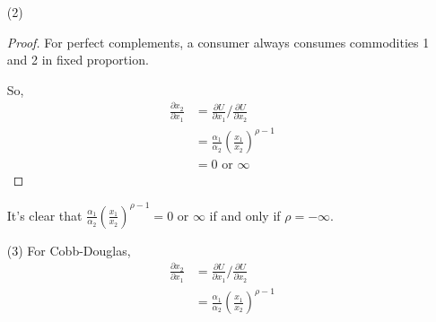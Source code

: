 \documentclass{article}
\begin{document}
\begin{enumerate}
\begin{enumerate}
\begin{proof}
            So, 
            \begin{equation}
                \begin{aligned}
                    \frac{\partial x_2}{\partial x_1}
                    &=\frac{\partial U}{\partial x_1}/\frac{\partial U}{\partial x_2} \\
                    &=\frac{\frac{1}{\rho}(\alpha_1x_1^{\rho}+\alpha_2x_2^{\rho})^{\frac{1}{\rho}-1}\alpha_1\rho x_1^{\rho-1}}{\frac{1}{\rho}(\alpha_1x_1^{\rho}+\alpha_2x_2^{\rho})^{\frac{1}{\rho}-1}\alpha_2\rho x_2^{\rho-1}} \\
                    &=\frac{\alpha_1}{\alpha_2}(\frac{x_1}{x_2})^{\rho-1} \\
                    &=\text{constant rate}
                \end{aligned} \nonumber
            \end{equation}
        \end{proof}
        It's clear that $\frac{\alpha_1}{\alpha_2}(\frac{x_1}{x_2})^{\rho-1}$ is constant if and only if $\rho=1$.
        \item[(2)] \begin{proof}
            For perfect complements, a consumer always consumes commodities 1 and 2 in fixed proportion.\par
            So, 
            \begin{equation}
                \begin{aligned}
                    \frac{\partial x_2}{\partial x_1}
                    &=\frac{\partial U}{\partial x_1}/\frac{\partial U}{\partial x_2} \\
                    &=\frac{\alpha_1}{\alpha_2}(\frac{x_1}{x_2})^{\rho-1} \\
                    &=0\text{ or }\infty
                \end{aligned} \nonumber
            \end{equation}
        \end{proof}
        It's clear that $\frac{\alpha_1}{\alpha_2}(\frac{x_1}{x_2})^{\rho-1}=0\text{ or }\infty$ if and only if $\rho=-\infty$.
        \item[(3)] For Cobb-Douglas,
        \begin{equation}
            \begin{aligned}
                \frac{\partial x_2}{\partial x_1}
                &=\frac{\partial U}{\partial x_1}/\frac{\partial U}{\partial x_2} \\
                &=\frac{\alpha_1}{\alpha_2}(\frac{x_1}{x_2})^{\rho-1} \\

\end{aligned}
\end{equation}
\end{enumerate}
\end{enumerate}
\end{document}
